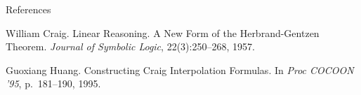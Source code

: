 \documentclass[final,hyperref={pdfpagelabels=true}]{beamer}
\newenvironment{postit}
{\begin{beamercolorbox}[sep=1em,wd=7cm]{postit}}
{\end{beamercolorbox}}
\newcommand{\itemizeOnBlockStart}{
		\vspace*{-0.5em}
	}
\begin{document}
\begin{frame}
\begin{columns}[t]
\begin{column}{\mycolwidth}
			\begin{block}{References}
			\itemizeOnBlockStart

				\begin{thebibliography}{999}

						William Craig.
						{
							\color{black}
							Linear Reasoning. A New Form of the Herbrand-Gentzen Theorem.
						}
						{
							\emph{Journal of Symbolic Logic}, 22(3):250--268, 1957.
						}


						Guoxiang Huang.
						{
							\color{black}
							Constructing Craig Interpolation Formulas.
						}
						{
							In \emph{Proc COCOON ’95}, p.\ 181--190, 1995. 
						}




				\end{thebibliography}
			\end{block}
		\end{column}
	\end{columns}


\end{frame}
\end{document}
